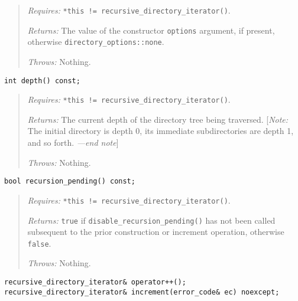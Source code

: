 \begin{quote}
\emph{Requires:} \texttt{*this\ !=\ recursive\_directory\_iterator()}.

\emph{Returns:} The value of the constructor \texttt{options} argument,
if present, otherwise \texttt{directory\_options::none}.

\emph{Throws:} Nothing.
\end{quote}

\begin{verbatim}
int depth() const;
\end{verbatim}

\begin{quote}
\emph{Requires:} \texttt{*this\ !=\ recursive\_directory\_iterator()}.

\emph{Returns:} The current depth of the directory tree being traversed.
{[}\emph{Note:} The initial directory is depth 0, its immediate
subdirectories are depth 1, and so forth. \emph{---end note}{]}

\emph{Throws:} Nothing.
\end{quote}

\begin{verbatim}
bool recursion_pending() const;
\end{verbatim}

\begin{quote}
\emph{Requires:} \texttt{*this\ !=\ recursive\_directory\_iterator()}.

\emph{Returns:} \texttt{true} if \texttt{disable\_recursion\_pending()}
has not been called subsequent to the prior construction or increment
operation, otherwise \texttt{false}.

\emph{Throws:} Nothing.
\end{quote}

\begin{verbatim}
recursive_directory_iterator& operator++();
recursive_directory_iterator& increment(error_code& ec) noexcept;
\end{verbatim}

